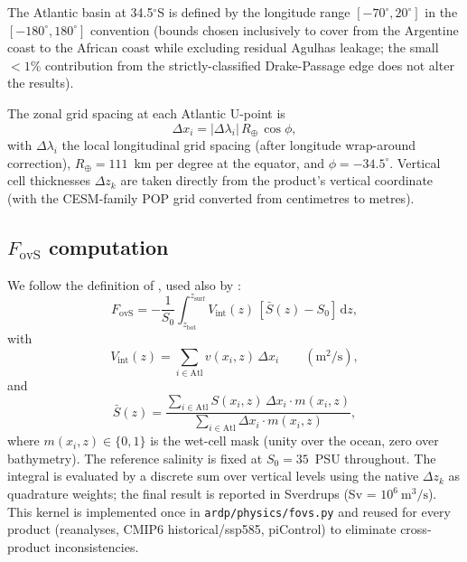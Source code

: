 \documentclass[11pt,a4paper]{article}
\newcommand{\Fovs}{F_\mathrm{ovS}}
\begin{document}
The Atlantic basin at 34.5$^\circ$S is defined by the longitude range $[-70^\circ, 20^\circ]$ in the $[-180^\circ, 180^\circ]$ convention (bounds chosen inclusively to cover from the Argentine coast to the African coast while excluding residual Agulhas leakage; the small $<1\%$ contribution from the strictly-classified Drake-Passage edge does not alter the results).

The zonal grid spacing at each Atlantic U-point is
\begin{equation}
\Delta x_i = |\Delta\lambda_i|\, R_\oplus\, \cos\phi,
\end{equation}
with $\Delta\lambda_i$ the local longitudinal grid spacing (after longitude wrap-around correction), $R_\oplus = 111$~km per degree at the equator, and $\phi = -34.5^\circ$. Vertical cell thicknesses $\Delta z_k$ are taken directly from the product's vertical coordinate (with the CESM-family POP grid converted from centimetres to metres).

\subsection*{$\Fovs$ computation}

We follow the definition of \citet{deVriesWeber2005}, used also by \citet{Dijkstra2007, Drijfhout2011, vanWesten2024}:
\begin{equation}
\Fovs = -\frac{1}{S_0}\int_{z_\mathrm{bot}}^{z_\mathrm{surf}}
  V_\mathrm{int}(z)\,[\bar{S}(z) - S_0]\,\mathrm{d}z,
\end{equation}
with
\begin{equation}
V_\mathrm{int}(z) = \sum_{i\in\mathrm{Atl}} v(x_i, z)\,\Delta x_i \qquad(\mathrm{m}^2/\mathrm{s}),
\end{equation}
and
\begin{equation}
\bar{S}(z) = \frac{\sum_{i\in\mathrm{Atl}} S(x_i, z)\,\Delta x_i
                  \cdot m(x_i, z)}
                 {\sum_{i\in\mathrm{Atl}} \Delta x_i \cdot m(x_i, z)},
\end{equation}
where $m(x_i, z)\in\{0, 1\}$ is the wet-cell mask (unity over the ocean, zero over bathymetry). The reference salinity is fixed at $S_0 = 35$~PSU throughout. The integral is evaluated by a discrete sum over vertical levels using the native $\Delta z_k$ as quadrature weights; the final result is reported in Sverdrups (Sv = $10^6~\mathrm{m}^3/\mathrm{s}$). This kernel is implemented once in \texttt{ardp/physics/fovs.py} and reused for every product (reanalyses, CMIP6 historical/ssp585, piControl) to eliminate cross-product inconsistencies.
\end{document}
